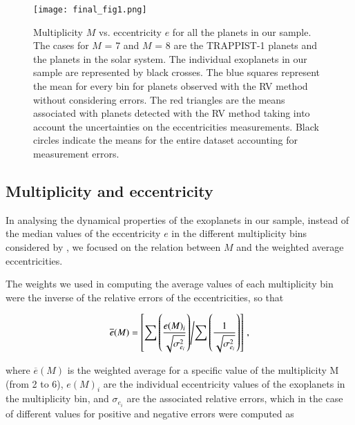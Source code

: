 \documentclass[letter]{aa} %
\begin{document}
        \begin{figure}
                \centering
                \texttt{[image: final\_fig1.png]}
                \caption{Multiplicity $M$ vs. eccentricity $e$ for all the planets in our sample. The cases for $M$ = 7 and $M$ = 8 are the TRAPPIST-1 planets and the planets in the solar system. The individual exoplanets in our sample are represented by black crosses. The blue squares represent the mean for every bin for planets observed with the RV method without considering errors. The red triangles are the means associated with planets detected with the RV method taking into account the uncertainties on the eccentricities measurements. Black circles indicate the means for the entire dataset accounting for measurement errors.
                }
                \label{Fig1}
        \end{figure}
        
        \subsection{Multiplicity and eccentricity}
        
In analysing the dynamical properties of the exoplanets in our sample, instead of the median values of the eccentricity $e$ in the different multiplicity bins considered by \cite{limbach}, we focused on the relation between $M$ and the weighted average eccentricities. 

        The weights we used in computing the average values of each multiplicity bin were the inverse of the relative errors of the  eccentricities, so that
        
        \begin{equation}
        \overline{e}(M) =       \left[\sum{\left(\frac{e(M)_{i}}{\sqrt{\sigma_{e_{i}}^{2}}}\right)} \middle/        \sum{\left(\frac{1}{\sqrt{\sigma_{e_{i}}^{2}}}\right)}\right] \,
        ,\end{equation}
        
        where $\overline{e}(M)$ is the weighted average for a specific value of the multiplicity M (from 2 to 6), $e(M)_{i}$ are the individual eccentricity values of the exoplanets in the multiplicity bin, and $\sigma_{e_{i}}$ are the associated relative errors, which in the case of different values for positive and negative errors were computed as
        
\end{document}
